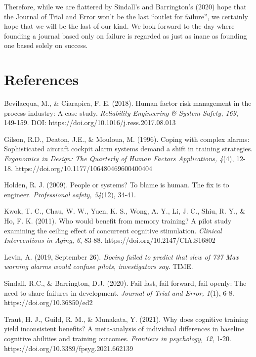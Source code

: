 \documentclass{article}
\begin{document}
Therefore, while we are flattered by Sindall's and Barrington's (2020) hope that the Journal of Trial and Error won't be the last “outlet for failure”, we certainly hope that we will be the last of our kind. We look forward to the day where founding a journal based only on failure is regarded as just as inane as founding one based solely on success. 

\section{}

\section{References }

Bevilacqua, M., \& Ciarapica, F. E. (2018). Human factor risk management in the process industry: A case study. \emph{Reliability Engineering \& System Safety, 169}, 149-159. DOI: https://doi.org/10.1016/j.ress.2017.08.013



Gilson, R.D., Deaton, J.E., \& Mouloua, M. (1996). Coping with complex alarms: Sophisticated aircraft cockpit alarm systems demand a shift in training strategies. \emph{Ergonomics in Design: The Quarterly of Human Factors Applications, 4}(4), 12-18. https://doi.org/10.1177/106480469600400404



Holden, R. J. (2009). People or systems? To blame is human. The fix is to engineer. \emph{Professional safety, 54}(12), 34-41. 

Kwok, T. C., Chau, W. W., Yuen, K. S., Wong, A. Y., Li, J. C., Shiu, R. Y., \& Ho, F. K. (2011). Who would benefit from memory training? A pilot study examining the ceiling effect of concurrent cognitive stimulation. \emph{Clinical Interventions in Aging, 6}, 83-88. https://doi.org/10.2147/CIA.S16802

Levin, A. (2019, September 26). \emph{Boeing failed to predict that slew of 737 Max warning alarms would confuse pilots, investigators say}. TIME.  

Sindall, R.C., \& Barrington, D.J. (2020). Fail fast, fail forward, fail openly: The need to share failures in development. \emph{Journal of Trial and Error, 1}(1), 6-8. https://doi.org/10.36850/ed2 

Traut, H. J., Guild, R. M., \& Munakata, Y. (2021). Why does cognitive training yield inconsistent benefits? A meta-analysis of individual differences in baseline cognitive abilities and training outcomes.\emph{ Frontiers in psychology, 12}, 1-20. https://doi.org/10.3389/fpsyg.2021.662139
\end{document}
